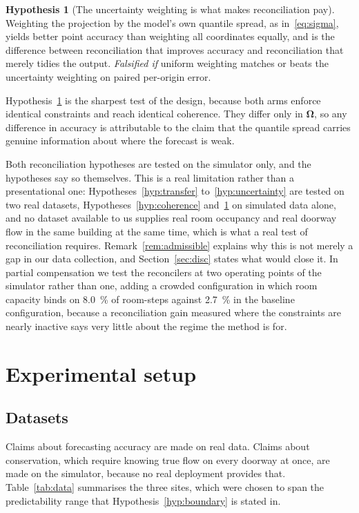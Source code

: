 \documentclass[utf8]{FrontiersinHarvard}
\newif\ifrevisionmarkup
\newcommand{\new}[1]{\ifrevisionmarkup\textcolor{revision}{#1}\else#1\fi}
\newif\ifsecondrevisionmarkup
\newcommand{\rev}[1]{\ifsecondrevisionmarkup\textcolor{revisiontwo}{#1}\else#1\fi}
\theoremstyle{plain}
\theoremstyle{definition}
\newtheorem{hypothesis}{Hypothesis}
\theoremstyle{remark}
\newcommand{\bOm}{\bm{\Omega}}
\begin{document}
\begin{hypothesis}[The uncertainty weighting is what makes reconciliation pay]
\label{hyp:weights}
Weighting the projection by the model's own quantile spread, as in~\eqref{eq:sigma}, yields better point accuracy than weighting all coordinates equally, and is the difference between reconciliation that improves accuracy and reconciliation that merely tidies the output.
\emph{Falsified if} uniform weighting matches or beats the uncertainty weighting on paired per-origin error.
\end{hypothesis}

Hypothesis~\ref{hyp:weights} is the sharpest test of the design, because both arms enforce identical constraints and reach identical coherence. They differ only in $\bOm$, so any difference in accuracy is attributable to the claim that the quantile spread carries genuine information about where the forecast is weak.

\new{Both reconciliation hypotheses are tested on the simulator only, \rev{and the hypotheses say so themselves. This is a real limitation rather than a presentational one:} Hypotheses~\ref{hyp:transfer} to~\ref{hyp:uncertainty} are tested on two real datasets, Hypotheses~\ref{hyp:coherence} and~\ref{hyp:weights} on simulated data alone, and no dataset available to us supplies real room occupancy and real doorway flow in the same building at the same time, which is what a real test of reconciliation requires. Remark~\ref{rem:admissible} explains why this is not merely a gap in our data collection, and Section~\ref{sec:disc} states what would close it. In partial compensation we test the reconcilers at two operating points of the simulator rather than one, adding a crowded configuration in which room capacity binds on \SI{8.0}{\percent} of room-steps against \SI{2.7}{\percent} in the baseline configuration, because a reconciliation gain measured where the constraints are nearly inactive \rev{says} very little about the regime the method is for.}

\section{Experimental setup}
\label{sec:setup}

\subsection{Datasets}

Claims about forecasting accuracy are made on real data. Claims about conservation, which require knowing true flow on every doorway at once, are made on the simulator, because no real deployment provides that. Table~\ref{tab:data} summarises the three sites, which were chosen to span the predictability range that Hypothesis~\ref{hyp:boundary} is stated in.
\end{document}
